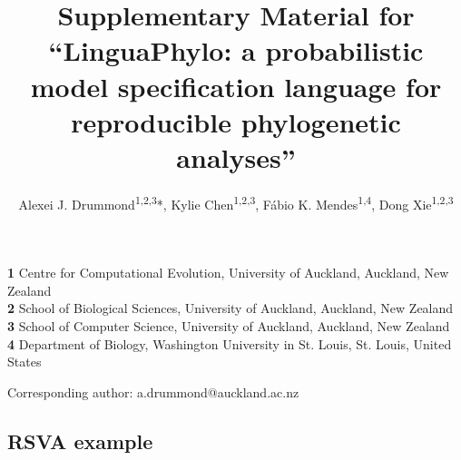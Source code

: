 \documentclass[12pt]{article} %
\begin{document}
\title{Supplementary Material for ``LinguaPhylo: a probabilistic model specification language for reproducible phylogenetic analyses''}

\date{}

\author{
Alexei J. Drummond\textsuperscript{1,2,3}*,
Kylie Chen\textsuperscript{1,2,3},
F\'{a}bio K. Mendes\textsuperscript{1,4},
Dong Xie\textsuperscript{1,2,3}
}

\maketitle 

{\small
\noindent \textbf{1} Centre for Computational Evolution, University of Auckland, Auckland, New Zealand
\\
\textbf{2} School of Biological Sciences, University of Auckland, Auckland, New Zealand
\\
\textbf{3} School of Computer Science, University of Auckland, Auckland, New Zealand
\\
\textbf{4} Department of Biology, Washington University in St. Louis, St. Louis, United States\\
}

\medskip

\noindent *Corresponding author: a.drummond@auckland.ac.nz

\clearpage


\subsection*{RSVA example}
\end{document}
